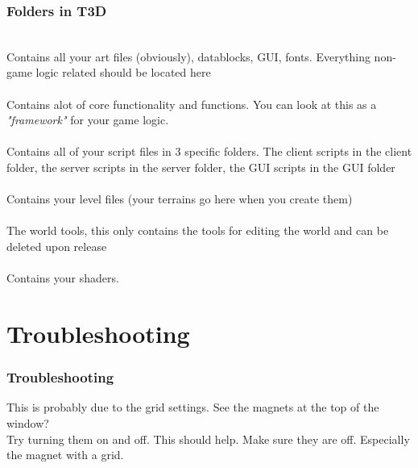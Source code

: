 \begin{frame}
\hypertarget{QG-Folder}{}
\frametitle{Folders in T3D}
	\\
	Contains all your art files (obviously), datablocks, GUI, fonts. Everything non-game logic related should be located here\\
	\\
	Contains alot of core functionality and functions. You can look at this as a {\it "framework"} for your game logic.\\
	\\
	Contains all of your script files in 3 specific folders. The client scripts in the client folder, the server scripts in the server folder, the GUI scripts in the GUI folder\\
	\\
	Contains your level files (your terrains go here when you create them)\\
	\\
	The world tools, this only contains the tools for editing the world and can be deleted upon release\\
	\\
	Contains your shaders.
\end{frame}

\section{Troubleshooting}
\begin{frame}
\frametitle{Troubleshooting}
This is probably due to the grid settings. See the magnets at the top of the window?\\
Try turning them on and off. This should help. Make sure they are off. Especially the magnet with a grid.
\end{frame}

